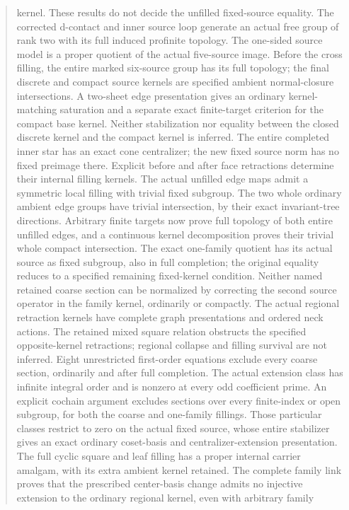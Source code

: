 \documentclass[11pt,a4paper]{article}
\begin{document}
\begin{abstract}
kernel. These results do not decide the unfilled fixed-source equality.
The corrected d-contact and inner source loop generate an actual free
group of rank two with its full induced profinite topology. The one-sided
source model is a proper quotient of the actual five-source image.
Before the cross filling, the entire marked six-source group has its
full topology; the final discrete and compact source kernels are specified
ambient normal-closure intersections. A two-sheet edge presentation gives
an ordinary kernel-matching saturation and a separate exact finite-target
criterion for the compact base kernel. Neither stabilization nor equality
between the closed discrete kernel and the compact kernel is inferred.
The entire completed inner star has an exact cone centralizer;
the new fixed source norm has no fixed preimage there. Explicit before
and after face retractions determine their internal filling kernels.
The actual unfilled edge maps admit a symmetric local filling with
trivial fixed subgroup. The two whole ordinary ambient edge groups have
trivial intersection, by their exact invariant-tree directions.
Arbitrary finite targets now prove full topology of both entire
unfilled edges, and a continuous kernel decomposition proves their
trivial whole compact intersection. The exact one-family quotient has
its actual source as fixed subgroup, also in full completion; the
original equality reduces to a specified remaining fixed-kernel
condition. Neither named retained coarse section can be normalized by
correcting the second source operator in the family kernel, ordinarily
or compactly. The actual regional retraction kernels have complete
graph presentations and ordered neck actions. The retained mixed square
relation obstructs the specified opposite-kernel retractions; regional
collapse and filling survival are not inferred. Eight unrestricted first-order
equations exclude every coarse section, ordinarily and after full
completion. The actual extension class has infinite integral order and
is nonzero at every odd coefficient prime. An explicit cochain argument
excludes sections over every finite-index or open subgroup, for both
the coarse and one-family fillings. Those particular classes restrict
to zero on the actual fixed source, whose entire stabilizer gives an
exact ordinary coset-basis and centralizer-extension presentation.
The full cyclic square and leaf filling has a proper internal carrier
amalgam, with its extra ambient kernel retained. The complete family
link proves that the prescribed center-basis change admits no injective
extension to the ordinary regional kernel, even with arbitrary family

\end{abstract}
\end{document}
